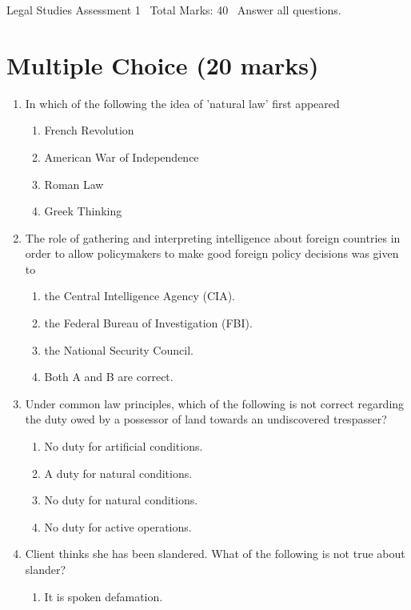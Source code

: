 \documentclass[12pt]{article}
\begin{document}
\begin{center}
Legal Studies Assessment 1 \
Total Marks: 40 \
Answer all questions.
\end{center}

\section*{Multiple Choice (20 marks)}
\begin{enumerate}[label=\arabic*.]
\item In which of the following the idea of 'natural law' first appeared
\begin{enumerate}[label=(\alph*)]
    \item French Revolution
    \item American War of Independence
    \item Roman Law
    \item Greek Thinking
\end{enumerate}
\item The role of gathering and interpreting intelligence about foreign countries in order to allow policymakers to make good foreign policy decisions was given to
\begin{enumerate}[label=(\alph*)]
    \item the Central Intelligence Agency (CIA).
    \item the Federal Bureau of Investigation (FBI).
    \item the National Security Council.
    \item Both A and B are correct.
\end{enumerate}
\item Under common law principles, which of the following is not correct regarding the duty owed by a possessor of land towards an undiscovered trespasser?
\begin{enumerate}[label=(\alph*)]
    \item No duty for artificial conditions.
    \item A duty for natural conditions.
    \item No duty for natural conditions.
    \item No duty for active operations.
\end{enumerate}
\item Client thinks she has been slandered. What of the following is not true about slander?
\begin{enumerate}[label=(\alph*)]
    \item It is spoken defamation.

\end{enumerate}
\end{enumerate}
\end{document}
